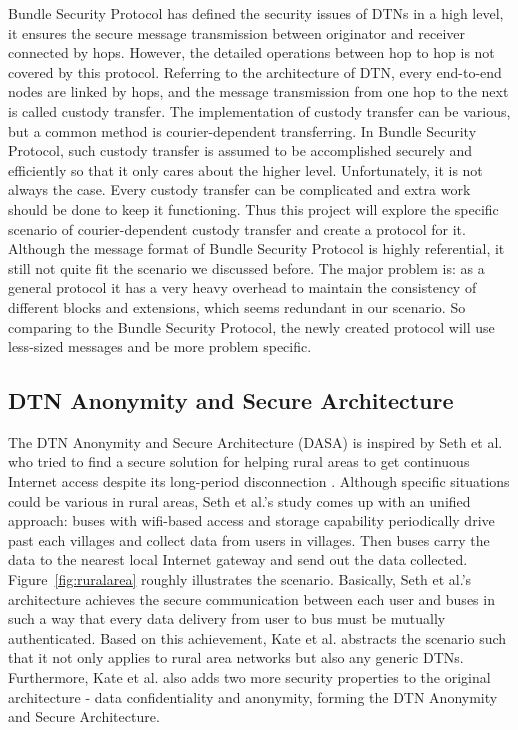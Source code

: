 Bundle Security Protocol has defined the security issues of DTNs in a high level, it ensures the secure message transmission between originator and receiver connected by hops. However, the detailed operations between hop to hop is not covered by this protocol. Referring to the architecture of DTN, every end-to-end nodes are linked by hops, and the message transmission from one hop to the next is called custody transfer. The implementation of custody transfer can be various, but a common method is courier-dependent transferring. In Bundle Security Protocol, such custody transfer is assumed to be accomplished securely and efficiently so that it only cares about the higher level. Unfortunately, it is not always the case. Every custody transfer can be complicated and extra work should be done to keep it functioning. Thus this project will explore the specific scenario of courier-dependent custody transfer and create a protocol for it. Although the message format of Bundle Security Protocol is highly referential, it still not quite fit the scenario we discussed before. The major problem is: as a general protocol it has a very heavy overhead to maintain the consistency of different blocks and extensions, which seems redundant in our scenario. So comparing to the Bundle Security Protocol, the newly created protocol will use less-sized messages and be more problem specific.

\subsection{DTN Anonymity and Secure Architecture \cite{Kate}}
The DTN Anonymity and Secure Architecture (DASA) is inspired by Seth et al. who tried to find a secure solution for helping rural areas to get continuous Internet access despite its long-period disconnection \cite{SethKeshav}\cite{Seth}. Although specific situations could be various in rural areas, Seth et al.'s study comes up with an unified approach: buses with wifi-based access and storage capability periodically drive past each villages and collect data from users in villages. Then buses carry the data to the nearest local Internet gateway and send out the data collected. Figure~\ref{fig:ruralarea} roughly illustrates the scenario. Basically, Seth et al.'s architecture achieves the secure communication between each user and buses in such a way that every data delivery from user to bus must be mutually authenticated. Based on this achievement, Kate et al. abstracts the scenario such that it not only applies to rural area networks but also any generic DTNs. Furthermore, Kate et al. also adds two more security properties to the original architecture - data confidentiality and anonymity, forming the DTN Anonymity and Secure Architecture.

